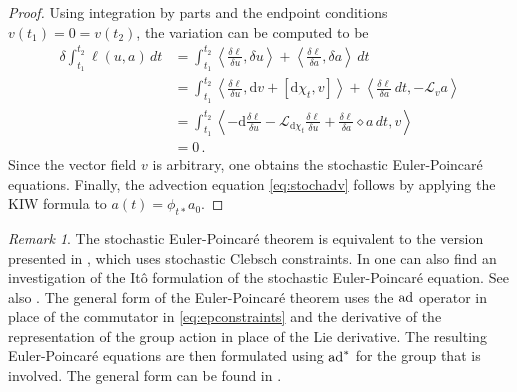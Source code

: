 \documentclass[11pt, oneside]{article}   	%
\numberwithin{equation}{section}
\theoremstyle{plain}
\theoremstyle{definition}
\theoremstyle{remark}
\newtheorem{remark}[theorem]{Remark}
\newcommand{\<}{\langle}
\renewcommand{\>}{\rangle}
\def\rmd{{\mathrm{d}}}
\begin{document}
\begin{proof}
Using integration by parts and the endpoint conditions $v(t_1)=0=v(t_2)$, the variation can be computed to be
\begin{equation}
\begin{aligned}
\delta\int_{t_1}^{t_2}\ell(u,a)\,dt 
&= 
\int_{t_1}^{t_2}\left\langle\frac{\delta\ell}{\delta u},\delta u\right\rangle + \left\langle\frac{\delta\ell}{\delta a},\delta a\right\rangle\,dt\\
&= \int_{t_1}^{t_2}\left\langle\frac{\delta\ell}{\delta u},{\rmd}v + [{\rmd}\chi_t,v]\right\rangle + \left\langle\frac{\delta\ell}{\delta a}\,dt,-\mathcal{L}_v a\right\rangle\\
&= \int_{t_1}^{t_2}\left\langle -{\rmd}\frac{\delta\ell}{\delta u} - \mathcal{L}_{{\rmd}\chi_t}\frac{\delta\ell}{\delta u} + \frac{\delta\ell}{\delta a}\diamond a\,dt,v\right\rangle\\
&= 0\,.
\end{aligned}
\end{equation}
Since the vector field $v$ is arbitrary, one obtains the stochastic Euler-Poincar\'e equations. Finally, the advection equation \eqref{eq:stochadv} follows by applying the KIW formula to $a(t)=\phi_{t*}a_0$.  
\end{proof}

\begin{remark}
The stochastic Euler-Poincar\'e theorem is equivalent to the version presented in \cite{Holm2015}, which uses stochastic Clebsch constraints. In \cite{Holm2015} one can also find an investigation of the It\^o formulation of the stochastic Euler-Poincar\'e equation. See also \cite{cruzeiro2018momentum}. The general form of the Euler-Poincar\'e theorem uses the ${\rm ad}$ operator in place of the commutator in \eqref{eq:epconstraints} and the derivative of the representation of the group action in place of the Lie derivative. The resulting Euler-Poincar\'e equations are then formulated using ${\rm ad}^*$ for the group that is involved. The  general form can be found in \cite{holm1998euler}. 
\end{remark}
\end{document}
